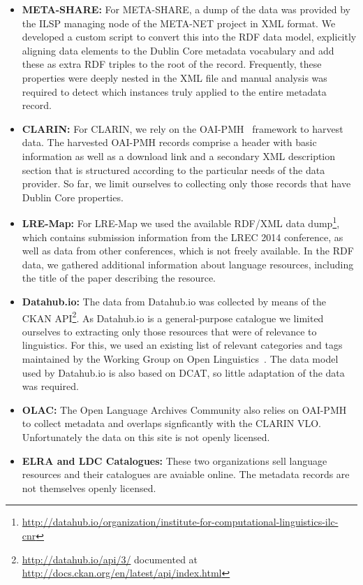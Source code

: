 \documentclass[11pt]{article}
\begin{document}
\begin{itemize}
\item \textbf{META-SHARE:} For META-SHARE, a dump of the data was
provided by the ILSP managing node of the META-NET project in XML format. We developed a custom script to convert this
into the RDF data model, explicitly aligning data elements to the
Dublin Core metadata vocabulary and add these as extra RDF triples to the root
of the record. Frequently, these properties were deeply nested in the XML file
and manual analysis was required to detect which instances truly applied to the
entire metadata record.

\item \textbf{CLARIN:} For CLARIN, we rely on the OAI-PMH~\cite{sompel2004resource} framework to harvest data.
The harvested OAI-PMH records comprise a header with basic information as well as a download link and a secondary XML description
section that is structured according to the particular needs of the data provider.
So far, we limit ourselves to collecting only those records that
have Dublin Core properties.
\item \textbf{LRE-Map:} For LRE-Map we used the available RDF/XML data
    dump\footnote{\url{http://datahub.io/organization/institute-for-computational-linguistics-ilc-cnr}},
    which contains submission information from the LREC 2014 conference, as well as data
    from other conferences, which is not freely available.
    In the RDF data, we gathered additional
    information about language resources, including the title of the paper 
    describing the resource.
\item \textbf{Datahub.io:} The data from Datahub.io was collected by means of
    the CKAN API\footnote{\url{http://datahub.io/api/3/} documented at
    \url{http://docs.ckan.org/en/latest/api/index.html}}. As Datahub.io
is a general-purpose catalogue we limited ourselves to extracting only those
resources that were of relevance to linguistics. For this, we used an existing
list of relevant categories and tags maintained by the Working Group on Open
Linguistics~\cite{chiarcos2012open}. The data model used by Datahub.io is 
also based on DCAT, so little adaptation of the data was required.
\item \textbf{OLAC:} The Open Language Archives Community also relies on OAI-PMH
    to collect metadata and overlaps signficantly with the CLARIN VLO.
    Unfortunately the data on this site is not openly licensed.
\item \textbf{ELRA and LDC Catalogues:} These two organizations sell language
    resources and their catalogues are avaiable online. The metadata records are
    not themselves openly licensed.
\end{itemize}
\end{document}
